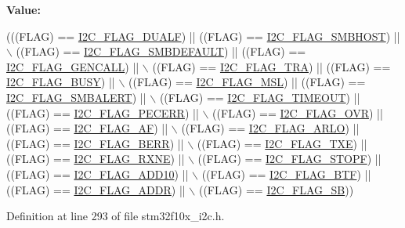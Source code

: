 {\bfseries Value\+:}
\begin{DoxyCode}
(((FLAG) == \hyperlink{group___i2_c__flags__definition_ga3755b783aa73568659478c2e2e45e27f}{I2C\_FLAG\_DUALF}) || ((FLAG) == \hyperlink{group___i2_c__flags__definition_gaf15403a1852f39aaadbb8942ba98d97e}{I2C\_FLAG\_SMBHOST}) || \(\backslash\)
                               ((FLAG) == \hyperlink{group___i2_c__flags__definition_ga371fb29861d1cd41736253e804c67ad5}{I2C\_FLAG\_SMBDEFAULT}) || ((FLAG) == 
      \hyperlink{group___i2_c__flags__definition_gab3a93b6840ad406c2fc09e0e96c59b88}{I2C\_FLAG\_GENCALL}) || \(\backslash\)
                               ((FLAG) == \hyperlink{group___i2_c__flags__definition_ga0359a5f960670d51cb17e659d32498ea}{I2C\_FLAG\_TRA}) || ((FLAG) == 
      \hyperlink{group___i2_c__flags__definition_ga50f69f043d99600221076100823b6ff3}{I2C\_FLAG\_BUSY}) || \(\backslash\)
                               ((FLAG) == \hyperlink{group___i2_c__flags__definition_gae8e6a404cbfd70420d278d520304f368}{I2C\_FLAG\_MSL}) || ((FLAG) == 
      \hyperlink{group___i2_c__flags__definition_ga4e1d7cd1574d03ba501c27483300c1be}{I2C\_FLAG\_SMBALERT}) || \(\backslash\)
                               ((FLAG) == \hyperlink{group___i2_c__flags__definition_ga89c8d5d8ccc77a8619fafe9b39d1cc74}{I2C\_FLAG\_TIMEOUT}) || ((FLAG) == 
      \hyperlink{group___i2_c__flags__definition_ga6c7addb6413f165f42bcc87506ea8467}{I2C\_FLAG\_PECERR}) || \(\backslash\)
                               ((FLAG) == \hyperlink{group___i2_c__flags__definition_gab579673c8ac920db199aa7f18e547fb3}{I2C\_FLAG\_OVR}) || ((FLAG) == 
      \hyperlink{group___i2_c__flags__definition_ga2f89dbba9b964e6ade1480705e7a97d4}{I2C\_FLAG\_AF}) || \(\backslash\)
                               ((FLAG) == \hyperlink{group___i2_c__flags__definition_gae1e67936f4780e42b8bbe04ac9c20a7b}{I2C\_FLAG\_ARLO}) || ((FLAG) == 
      \hyperlink{group___i2_c__flags__definition_ga0454176b6ddd5c402abc3ef5953a21ad}{I2C\_FLAG\_BERR}) || \(\backslash\)
                               ((FLAG) == \hyperlink{group___i2_c__flags__definition_gaeda14a3e9d02ff20a0d001bba9328f3d}{I2C\_FLAG\_TXE}) || ((FLAG) == 
      \hyperlink{group___i2_c__flags__definition_gad53c5b70a186f699f187c7a641ab0dac}{I2C\_FLAG\_RXNE}) || \(\backslash\)
                               ((FLAG) == \hyperlink{group___i2_c__flags__definition_gacc7d993963e199a6ddba391dab8da896}{I2C\_FLAG\_STOPF}) || ((FLAG) == 
      \hyperlink{group___i2_c__flags__definition_ga316c78cbf34b74da96d69f702a0d1444}{I2C\_FLAG\_ADD10}) || \(\backslash\)
                               ((FLAG) == \hyperlink{group___i2_c__flags__definition_ga4dc3d44342007a5cd21c3baa0d938606}{I2C\_FLAG\_BTF}) || ((FLAG) == 
      \hyperlink{group___i2_c__flags__definition_ga5472d1196e934e0cc471aba8f66af416}{I2C\_FLAG\_ADDR}) || \(\backslash\)
                               ((FLAG) == \hyperlink{group___i2_c__flags__definition_gae009ab84be03fcc438625b1c39376ad4}{I2C\_FLAG\_SB}))
\end{DoxyCode}


Definition at line 293 of file stm32f10x\+\_\+i2c.\+h.

